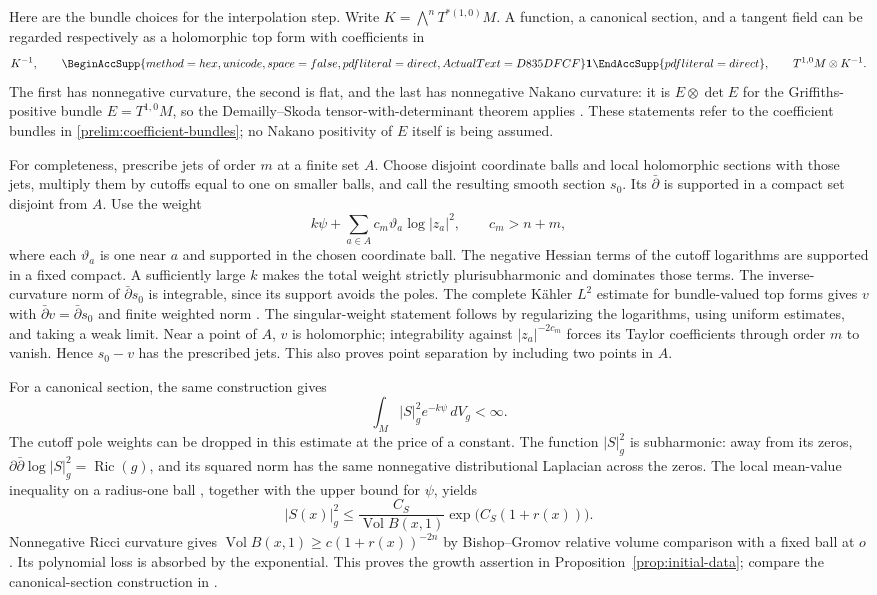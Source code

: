 \documentclass[11pt]{article}
\theoremstyle{definition}
\theoremstyle{remark}
\newcommand{\dd}{\partial\bar\partial}
\newcommand{\dbar}{\bar\partial}
\DeclareMathOperator{\Ric}{Ric}
\DeclareMathOperator{\Vol}{Vol}
\numberwithin{equation}{section}
\newcommand{\MathActualText}[2]{%
  \BeginAccSupp{method=hex,unicode,space=false,pdfliteral=direct,ActualText=#1}%
  #2%
  \EndAccSupp{pdfliteral=direct}%
}
\newcommand{\boldone}{\mathord{\MathActualText{D835DFCF}{\mathbf1}}}
\begin{document}
Here are the bundle choices for the interpolation step.  Write
$K=\bigwedge^nT^{*(1,0)}M$.  A function, a canonical section, and a
tangent field can be regarded respectively as a holomorphic top form
with coefficients in
\begin{equation}\label{prelim:coefficient-bundles}
 K^{-1},\qquad \boldone,\qquad T^{1,0}M\otimes K^{-1}.
\end{equation}
The first has nonnegative curvature, the second is flat, and the last
has nonnegative Nakano curvature: it is $E\otimes\det E$ for the
Griffiths-positive bundle $E=T^{1,0}M$, so the
Demailly--Skoda tensor-with-determinant theorem applies
\cite[Theorem~2.6]{Demailly}.  These statements refer to the coefficient bundles
in \eqref{prelim:coefficient-bundles}; no Nakano positivity of $E$
itself is being assumed.

For completeness, prescribe jets of order $m$ at a finite set $A$.
Choose disjoint coordinate balls and local holomorphic sections with
those jets, multiply them by cutoffs equal to one on smaller balls,
and call the resulting smooth section $s_0$.  Its $\dbar$ is supported
in a compact set disjoint from $A$.  Use the weight
\[
 k\psi+\sum_{a\in A}c_m\vartheta_a\log|z_a|^2,
 \qquad c_m>n+m,
\]
where each $\vartheta_a$ is one near $a$ and supported in the chosen
coordinate ball.  The negative Hessian terms of the cutoff logarithms
are supported in a fixed compact.  A sufficiently large $k$ makes the
total weight strictly plurisubharmonic and dominates those terms.
The inverse-curvature norm of $\dbar s_0$ is integrable, since its
support avoids the poles.  The complete K\"ahler $L^2$ estimate for
bundle-valued top forms gives $v$ with
$\dbar v=\dbar s_0$ and finite weighted norm
\cite{Hormander}\cite[Theorem~5.1]{Demailly}.  The singular-weight statement follows by
regularizing the logarithms, using uniform estimates, and taking a
weak limit.  Near a point of $A$, $v$ is holomorphic; integrability
against $|z_a|^{-2c_m}$ forces its Taylor coefficients through order
$m$ to vanish.  Hence $s_0-v$ has the prescribed jets.  This also proves
point separation by including two points in $A$.

For a canonical section, the same construction gives
\[
 \int_M |S|_g^2 e^{-k\psi}\,dV_g<\infty.
\]
The cutoff pole weights can be dropped in this estimate at the price
of a constant.  The function $|S|_g^2$ is subharmonic: away from its
zeros, $\dd\log|S|_g^2=\Ric(g)$, and its squared norm has the same
nonnegative distributional Laplacian across the zeros.  The local
mean-value inequality on a radius-one ball
\cite[Theorem~2.1]{LiSchoen}, together with the upper bound for
$\psi$, yields
\[
 |S(x)|_g^2\le
 \frac{C_S}{\Vol B(x,1)}\exp\bigl(C_S(1+r(x))\bigr).
\]
Nonnegative Ricci curvature gives
$\Vol B(x,1)\ge c(1+r(x))^{-2n}$ by Bishop--Gromov relative volume
comparison with a fixed ball at $o$ \cite[\S2.1]{GromovBetti}.
Its polynomial loss is absorbed by the exponential.
This proves the growth assertion in Proposition~\ref{prop:initial-data};
compare the canonical-section construction in
\cite[Section~3]{ChenZhu}.
\end{document}
